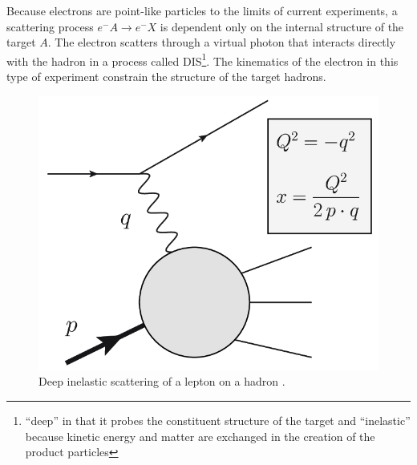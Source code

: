 Because electrons are point-like particles to the limits of current experiments, a scattering process $e^- A \rightarrow e^- X$ is dependent only on the internal structure of the target $A$.
The electron scatters through a virtual photon that interacts directly with the hadron in a process called \ac{DIS}\footnote{``deep'' in that it probes the constituent structure of the target and ``inelastic'' because kinetic energy and matter are exchanged in the creation of the product particles}.
The kinematics of the electron in this type of experiment constrain the structure of the target hadrons.

\begin{figure}[t]
  \includegraphics{dis_electron_proton.png}
  \caption{Deep inelastic scattering of a lepton on a hadron \cite{dis_fig_proceedings}.}
  \label{fig:dis}
\end{figure}

